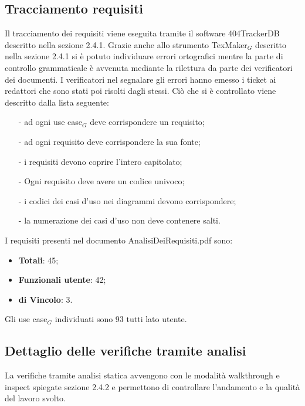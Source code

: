 \subsection{Tracciamento requisiti}
Il tracciamento dei requisiti viene eseguita tramite il software 404TrackerDB descritto nella sezione 2.4.1. 
Grazie anche allo strumento TexMaker$_G$ descritto nella sezione 2.4.1 si è potuto individuare errori ortografici mentre la parte di controllo grammaticale è avvenuta mediante la rilettura da parte dei verificatori dei documenti. I verificatori nel segnalare gli errori hanno emesso i ticket ai redattori che sono stati poi risolti dagli stessi.
Ciò che si è controllato viene descritto dalla lista seguente:
\begin{itemize}
\item[-] ad ogni use case$_G$ deve corrispondere un requisito;
\item[-] ad ogni requisito deve corrispondere la sua fonte;
\item[-] i requisiti devono coprire l'intero capitolato;
\item[-] Ogni requisito deve avere un codice univoco;
\item[-] i codici dei casi d'uso nei diagrammi devono corrispondere;
\item[-] la numerazione dei casi d'uso non deve contenere salti.
\end{itemize}
I requisiti presenti nel documento AnalisiDeiRequisiti.pdf sono:
\begin{itemize}
\item \textbf{Totali}: 45;
\item \textbf{Funzionali utente}: 42;   
\item \textbf{di Vincolo}: 3.
\end{itemize}
Gli use case$_G$ individuati sono 93 tutti lato utente.
\subsection{Dettaglio delle verifiche tramite analisi}
La verifiche tramite analisi statica avvengono con le modalità walkthrough e inspect spiegate sezione 2.4.2 e permettono di controllare l'andamento e la qualità del lavoro svolto.

